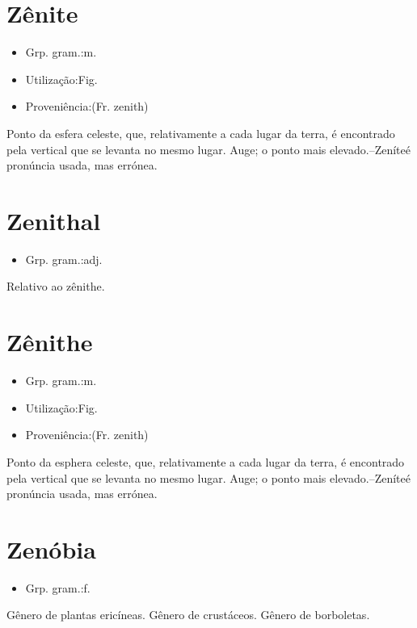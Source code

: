\section{Zênite}
\begin{itemize}
\item {Grp. gram.:m.}
\end{itemize}
\begin{itemize}
\item {Utilização:Fig.}
\end{itemize}
\begin{itemize}
\item {Proveniência:(Fr. \textunderscore zenith\textunderscore )}
\end{itemize}
Ponto da esfera celeste, que, relativamente a cada lugar da terra, é encontrado pela vertical que se levanta no mesmo lugar.
Auge; o ponto mais elevado.--\textunderscore Zeníte\textunderscore  é pronúncia usada, mas errónea.
\section{Zenithal}
\begin{itemize}
\item {Grp. gram.:adj.}
\end{itemize}
Relativo ao zênithe.
\section{Zênithe}
\begin{itemize}
\item {Grp. gram.:m.}
\end{itemize}
\begin{itemize}
\item {Utilização:Fig.}
\end{itemize}
\begin{itemize}
\item {Proveniência:(Fr. \textunderscore zenith\textunderscore )}
\end{itemize}
Ponto da esphera celeste, que, relativamente a cada lugar da terra, é encontrado pela vertical que se levanta no mesmo lugar.
Auge; o ponto mais elevado.--\textunderscore Zeníte\textunderscore  é pronúncia usada, mas errónea.
\section{Zenóbia}
\begin{itemize}
\item {Grp. gram.:f.}
\end{itemize}
Gênero de plantas ericíneas.
Gênero de crustáceos.
Gênero de borboletas.
